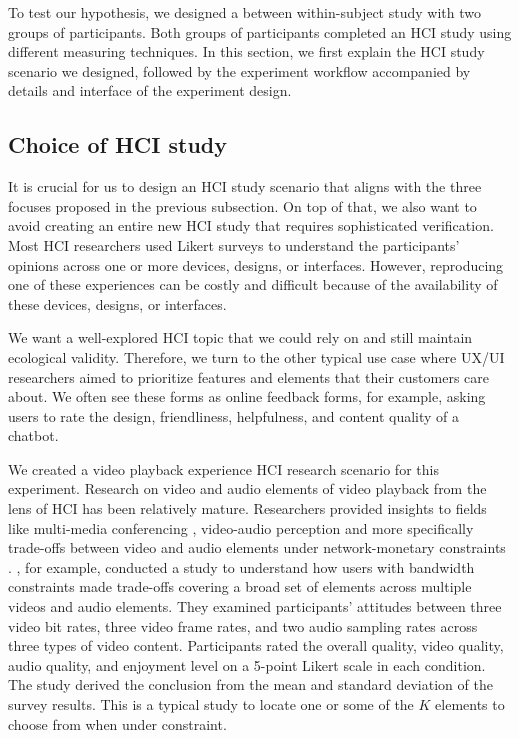 To test our hypothesis, we designed a between within-subject study with two groups of participants. Both groups of participants completed an HCI study using different measuring techniques. In this section, we first explain the HCI study scenario we designed, followed by the experiment workflow accompanied by details and interface of the experiment design.

 
\subsection{Choice of HCI study}
It is crucial for us to design an HCI study scenario that aligns with the three focuses proposed in the previous subsection. On top of that, we also want to avoid creating an entire new HCI study that requires sophisticated verification. Most HCI researchers used Likert surveys to understand the participants' opinions across one or more devices, designs, or interfaces. However, reproducing one of these experiences can be costly and difficult because of the availability of these devices, designs, or interfaces.

We want a well-explored HCI topic that we could rely on and still maintain ecological validity. Therefore, we turn to the other typical use case where UX/UI researchers aimed to prioritize features and elements that their customers care about. We often see these forms as online feedback forms, for example, asking users to rate the design, friendliness, helpfulness, and content quality of a chatbot.

We created a video playback experience HCI research scenario for this experiment. Research on video and audio elements of video playback from the lens of HCI has been relatively mature. Researchers provided insights to fields like multi-media conferencing \cite{watson1996evaluating}, video-audio perception \cite{chen2006cognitive, molnar2015assessing}and more specifically trade-offs between video and audio elements under network-monetary constraints \cite{molnar2013comedy, oeldorf2012bad}. \textcite{oeldorf2012bad}, for example, conducted a study to understand how users with bandwidth constraints made trade-offs covering a broad set of elements across multiple videos and audio elements. They examined participants' attitudes between three video bit rates, three video frame rates, and two audio sampling rates across three types of video content. Participants rated the overall quality, video quality, audio quality, and enjoyment level on a 5-point Likert scale in each condition. The study derived the conclusion from the mean and standard deviation of the survey results. This is a typical study to locate one or some of the $K$ elements to choose from when under constraint.

